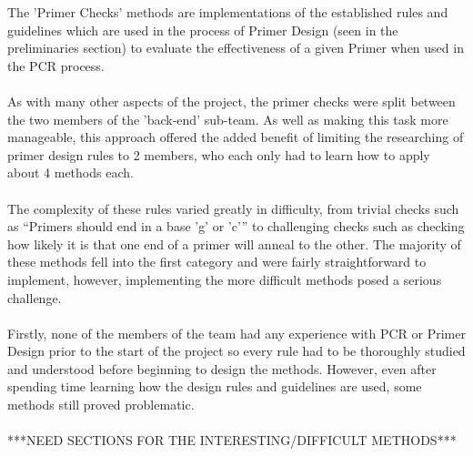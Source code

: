 The 'Primer Checks' methods are implementations of the established rules
and guidelines which are used in the process of Primer Design (seen in
the preliminaries section) to evaluate the effectiveness of a given 
Primer when used in the PCR process.
\\ \\
As with many other aspects of the project, the primer checks were split
between the two members of the 'back-end' sub-team. As well as making
this task more manageable, this approach offered the added benefit of
limiting the researching of primer design rules to 2 members, who each
only had to learn how to apply about 4 methods each.
\\ \\
The complexity of these rules varied greatly in difficulty, from
trivial checks such as “Primers should end in a base 'g' or 'c'” to
challenging checks such as checking how likely it is that one end of a
primer  will anneal to the other. The majority of these methods fell
into the first category and were fairly straightforward to implement,
however,  implementing the more difficult methods posed a serious
challenge.
\\ \\
Firstly, none of the members of the team had any experience with PCR or
Primer Design prior to the start of the project so every rule had to be
thoroughly studied and understood before beginning to design the
methods. However, even after spending time learning how the design
rules and guidelines are used, some methods still proved problematic.
\\ \\
***NEED SECTIONS FOR THE INTERESTING/DIFFICULT METHODS***
